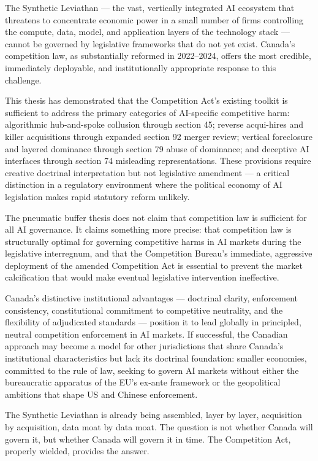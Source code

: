 The Synthetic Leviathan --- the vast, vertically integrated AI ecosystem that threatens to concentrate economic power in a small number of firms controlling the compute, data, model, and application layers of the technology stack --- cannot be governed by legislative frameworks that do not yet exist. Canada's competition law, as substantially reformed in 2022--2024, offers the most credible, immediately deployable, and institutionally appropriate response to this challenge.

This thesis has demonstrated that the Competition Act's existing toolkit is sufficient to address the primary categories of AI-specific competitive harm: algorithmic hub-and-spoke collusion through section 45; reverse acqui-hires and killer acquisitions through expanded section 92 merger review; vertical foreclosure and layered dominance through section 79 abuse of dominance; and deceptive AI interfaces through section 74 misleading representations. These provisions require creative doctrinal interpretation but not legislative amendment --- a critical distinction in a regulatory environment where the political economy of AI legislation makes rapid statutory reform unlikely.

The pneumatic buffer thesis does not claim that competition law is sufficient for all AI governance. It claims something more precise: that competition law is structurally optimal for governing competitive harms in AI markets during the legislative interregnum, and that the Competition Bureau's immediate, aggressive deployment of the amended Competition Act is essential to prevent the market calcification that would make eventual legislative intervention ineffective.

Canada's distinctive institutional advantages --- doctrinal clarity, enforcement consistency, constitutional commitment to competitive neutrality, and the flexibility of adjudicated standards --- position it to lead globally in principled, neutral competition enforcement in AI markets. If successful, the Canadian approach may become a model for other jurisdictions that share Canada's institutional characteristics but lack its doctrinal foundation: smaller economies, committed to the rule of law, seeking to govern AI markets without either the bureaucratic apparatus of the EU's ex-ante framework or the geopolitical ambitions that shape US and Chinese enforcement.

The Synthetic Leviathan is already being assembled, layer by layer, acquisition by acquisition, data moat by data moat. The question is not whether Canada will govern it, but whether Canada will govern it in time. The Competition Act, properly wielded, provides the answer.
